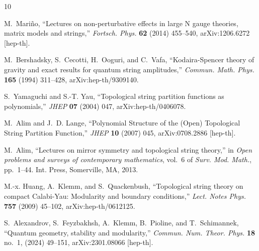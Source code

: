 \documentclass[a4paper,12pt,justification=centering]{article}
\numberwithin{equation}{section}
\providecommand{\href}[2]{#2}
\theoremstyle{plain}%
\theoremstyle{definition}
\begin{document}
\providecommand{\href}[2]{#2}\begingroup\raggedright\begin{thebibliography}{10}

M.~Mari\~no, ``{Lectures on non-perturbative effects in large N gauge theories,
  matrix models and strings},''
  \href{http://dx.doi.org/10.1002/prop.201400005}{{\em Fortsch. Phys.}
  {\bfseries 62} (2014) 455--540},
  \href{http://arxiv.org/abs/1206.6272}{{\ttfamily arXiv:1206.6272 [hep-th]}}.

M.~Bershadsky, S.~Cecotti, H.~Ooguri, and C.~Vafa, ``{Kodaira-Spencer theory of
  gravity and exact results for quantum string amplitudes},''
  \href{http://dx.doi.org/10.1007/BF02099774}{{\em Commun. Math. Phys.}
  {\bfseries 165} (1994) 311--428},
  \href{http://arxiv.org/abs/hep-th/9309140}{{\ttfamily arXiv:hep-th/9309140}}.

S.~Yamaguchi and S.-T. Yau, ``{Topological string partition functions as
  polynomials},'' \href{http://dx.doi.org/10.1088/1126-6708/2004/07/047}{{\em
  JHEP} {\bfseries 07} (2004) 047},
  \href{http://arxiv.org/abs/hep-th/0406078}{{\ttfamily arXiv:hep-th/0406078}}.

M.~Alim and J.~D. Lange, ``{Polynomial Structure of the (Open) Topological
  String Partition Function},''
  \href{http://dx.doi.org/10.1088/1126-6708/2007/10/045}{{\em JHEP} {\bfseries
  10} (2007) 045}, \href{http://arxiv.org/abs/0708.2886}{{\ttfamily
  arXiv:0708.2886 [hep-th]}}.

M.~Alim, ``Lectures on mirror symmetry and topological string theory,'' in {\em
  Open problems and surveys of contemporary mathematics}, vol.~6 of {\em Surv.
  Mod. Math.}, pp.~1--44.
\newblock Int. Press, Somerville, MA, 2013.

M.-x. Huang, A.~Klemm, and S.~Quackenbush, ``{Topological string theory on
  compact Calabi-Yau: Modularity and boundary conditions},''
  \href{http://dx.doi.org/10.1007/978-3-540-68030-7_3}{{\em Lect. Notes Phys.}
  {\bfseries 757} (2009) 45--102},
  \href{http://arxiv.org/abs/hep-th/0612125}{{\ttfamily arXiv:hep-th/0612125}}.

S.~Alexandrov, S.~Feyzbakhsh, A.~Klemm, B.~Pioline, and T.~Schimannek,
  ``{Quantum geometry, stability and modularity},''
  \href{http://dx.doi.org/10.4310/CNTP.2024.v18.n1.a2}{{\em Commun. Num. Theor.
  Phys.} {\bfseries 18} no.~1, (2024) 49--151},
  \href{http://arxiv.org/abs/2301.08066}{{\ttfamily arXiv:2301.08066
  [hep-th]}}.


\end{thebibliography}
\end{document}
